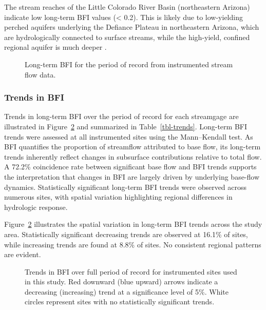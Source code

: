 \documentclass[
  authoryear,
  preprint,
  1p,
  onecolumn]{elsarticle}
\begin{document}
The stream reaches of the Little Colorado River Basin (northeastern
Arizona) indicate low long-term BFI values (\textless{} 0.2). This is
likely due to low-yielding perched aquifers underlying the Defiance
Plateau in northeastern Arizona, which are hydrologically connected to
surface streams, while the high-yield, confined regional aquifer is much
deeper \citep{blanchard02}.

\begin{figure}


\caption{\label{fig-instrumented-bfi}Long-term BFI for the period of
record from instrumented stream flow data.}

\end{figure}%

\subsubsection{Trends in BFI}\label{sec-bfi-trends}

Trends in long-term BFI over the period of record for each streamgage
are illustrated in Figure~\ref{fig-instrumented-trend} and summarized in
Table~\ref{tbl-trends}. Long-term BFI trends were assessed at all
instrumented sites using the Mann--Kendall test. As BFI quantifies the
proportion of streamflow attributed to base flow, its long-term trends
inherently reflect changes in subsurface contributions relative to total
flow. A 72.2\% coincidence rate between significant base flow and BFI
trends supports the interpretation that changes in BFI are largely
driven by underlying base-flow dynamics. Statistically significant
long-term BFI trends were observed across numerous sites, with spatial
variation highlighting regional differences in hydrologic response.

Figure~\ref{fig-instrumented-trend} illustrates the spatial variation in
long-term BFI trends across the study area. Statistically significant
decreasing trends are observed at 16.1\% of sites, while increasing
trends are found at 8.8\% of sites. No consistent regional patterns are
evident.

\begin{figure}


\caption{\label{fig-instrumented-trend}Trends in BFI over full period of
record for instrumented sites used in this study. Red downward (blue
upward) arrows indicate a decreasing (increasing) trend at a
significance level of 5\%. White circles represent sites with no
statistically significant trends.}

\end{figure}%
\end{document}
